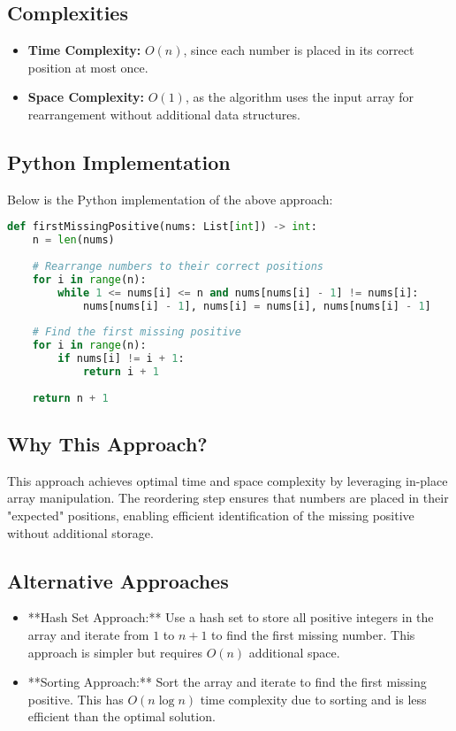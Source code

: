 \subsection*{Complexities}
\begin{itemize}
    \item \textbf{Time Complexity:} \(O(n)\), since each number is placed in its correct position at most once.
    \item \textbf{Space Complexity:} \(O(1)\), as the algorithm uses the input array for rearrangement without additional data structures.
\end{itemize}

\subsection*{Python Implementation}
Below is the Python implementation of the above approach:

\begin{fullwidth}
\begin{lstlisting}[language=Python]
def firstMissingPositive(nums: List[int]) -> int:
    n = len(nums)
    
    # Rearrange numbers to their correct positions
    for i in range(n):
        while 1 <= nums[i] <= n and nums[nums[i] - 1] != nums[i]:
            nums[nums[i] - 1], nums[i] = nums[i], nums[nums[i] - 1]
    
    # Find the first missing positive
    for i in range(n):
        if nums[i] != i + 1:
            return i + 1
    
    return n + 1
\end{lstlisting}
\end{fullwidth}

\subsection*{Why This Approach?}
This approach achieves optimal time and space complexity by leveraging in-place array manipulation. The reordering step ensures that numbers are placed in their "expected" positions, enabling efficient identification of the missing positive without additional storage.

\subsection*{Alternative Approaches}
\begin{itemize}
    \item **Hash Set Approach:**  
    Use a hash set to store all positive integers in the array and iterate from \(1\) to \(n+1\) to find the first missing number. This approach is simpler but requires \(O(n)\) additional space.
    \item **Sorting Approach:**  
    Sort the array and iterate to find the first missing positive. This has \(O(n \log n)\) time complexity due to sorting and is less efficient than the optimal solution.
\end{itemize}


